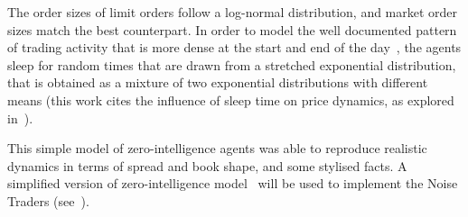 The order sizes of limit orders follow a log-normal distribution, and market order sizes match the best counterpart. In order to model the well documented pattern of trading activity that is more dense at the start and end of the day~\cite{Clark1973}, the agents sleep for random times that are drawn from a stretched exponential distribution, that is obtained as a mixture of two exponential distributions with different means (this work cites the influence of sleep time on price dynamics, as explored in~\cite{Scalas2004}).

This simple model of zero-intelligence agents was able to reproduce realistic dynamics in terms of spread and book shape, and some stylised facts. A simplified version of zero-intelligence model~\cite[chap.~4]{Gilles2006} will be used to implement the Noise Traders (see~).
